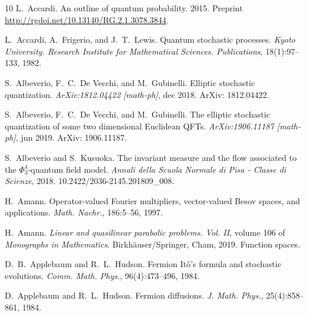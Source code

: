 \documentclass{article}
\newcommand{\tmtextit}[1]{{\itshape{#1}}}
\begin{document}
\begin{thebibliography}{10}
  L.~Accardi. {\newblock}An outline of
  quantum probability. {\newblock}2015. {\newblock}Preprint
  \url{http://rgdoi.net/10.13140/RG.2.1.3078.3844}.{\newblock}
  
  L.~Accardi, A.~Frigerio, and  J.~T.~Lewis.
  {\newblock}Quantum stochastic processes. {\newblock}\tmtextit{Kyoto
  University. Research Institute for Mathematical Sciences. Publications},
  18(1):97--133, 1982.{\newblock}
  
  S.~Albeverio, F.~C.~De Vecchi, and 
  M.~Gubinelli. {\newblock}Elliptic stochastic quantization.
  {\newblock}\tmtextit{ArXiv:1812.04422 [math-ph]}, dec 2018.
  {\newblock}ArXiv: 1812.04422.{\newblock}
  
  S.~Albeverio, F.~C.~De Vecchi, and 
  M.~Gubinelli. {\newblock}The elliptic stochastic quantization of some two
  dimensional Euclidean QFTs. {\newblock}\tmtextit{ArXiv:1906.11187
  [math-ph]}, jun 2019. {\newblock}ArXiv: 1906.11187.{\newblock}
  
  S.~Albeverio  and  S.~Kusuoka.
  {\newblock}The invariant measure and the flow associated to the
  $\Phi^4_3$-quantum field model. {\newblock}\tmtextit{Annali della Scuola
  Normale di Pisa - Classe di Scienze}, 2018.
  {\newblock}\href{Https://doi.org/10.2422/2036-2145.201809_008}{}10.2422/2036-2145.201809\_008.{\newblock}
  
  H.~Amann. {\newblock}Operator-valued Fourier
  multipliers, vector-valued Besov spaces, and applications.
  {\newblock}\tmtextit{Math. Nachr.}, 186:5--56, 1997.{\newblock}
  
  H.~Amann. {\newblock}\tmtextit{Linear and quasilinear
  parabolic problems. Vol. II},  volume  106  of \tmtextit{Monographs in
  Mathematics}. {\newblock}Birkh{\"a}user/Springer, Cham, 2019.
  {\newblock}Function spaces.{\newblock}
  
  D.~B.~Applebaum  and  R.~L.~Hudson.
  {\newblock}Fermion It{\^o}'s formula and stochastic evolutions.
  {\newblock}\tmtextit{Comm. Math. Phys.}, 96(4):473--496, 1984.{\newblock}
  
  D.~Applebaum  and  R.~L.~Hudson. {\newblock}Fermion
  diffusions. {\newblock}\tmtextit{J. Math. Phys.}, 25(4):858--861,
  1984.{\newblock}
  

\end{thebibliography}
\end{document}

